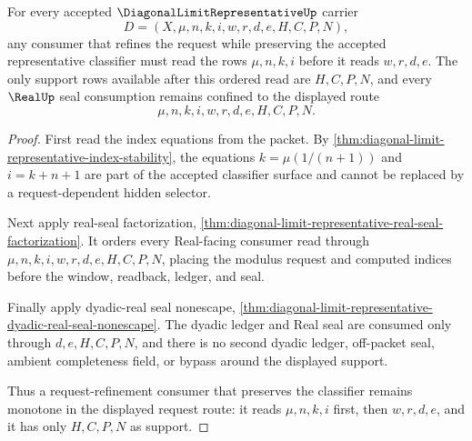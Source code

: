 \begin{theorem}
\label{thm:diagonal-limit-representative-request-monotone-seal-route}
For every accepted $\DiagonalLimitRepresentativeUp$ carrier
$$
D=(X,\mu,n,k,i,w,r,d,e,H,C,P,N),
$$
any consumer that refines the request while preserving the accepted representative classifier must read the rows $\mu,n,k,i$ before it reads $w,r,d,e$. The only support rows available after this ordered read are $H,C,P,N$, and every $\RealUp$ seal consumption remains confined to the displayed route
$$
\mu,n,k,i,w,r,d,e,H,C,P,N.
$$
\end{theorem}
\begin{proof}
First read the index equations from the packet. By \autoref{thm:diagonal-limit-representative-index-stability}, the equations $k=\mu(1/(n+1))$ and $i=k+n+1$ are part of the accepted classifier surface and cannot be replaced by a request-dependent hidden selector.

Next apply real-seal factorization, \autoref{thm:diagonal-limit-representative-real-seal-factorization}. It orders every Real-facing consumer read through $\mu,n,k,i,w,r,d,e,H,C,P,N$, placing the modulus request and computed indices before the window, readback, ledger, and seal.

Finally apply dyadic-real seal nonescape, \autoref{thm:diagonal-limit-representative-dyadic-real-seal-nonescape}. The dyadic ledger and Real seal are consumed only through $d,e,H,C,P,N$, and there is no second dyadic ledger, off-packet seal, ambient completeness field, or bypass around the displayed support.

Thus a request-refinement consumer that preserves the classifier remains monotone in the displayed request route: it reads $\mu,n,k,i$ first, then $w,r,d,e$, and it has only $H,C,P,N$ as support.
\end{proof}

